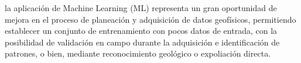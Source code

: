 la aplicación de Machine Learning (ML) representa un gran oportunidad de mejora en el proceso de planeación y adquisición de datos geofísicos, permitiendo establecer un conjunto de entrenamiento con pocos datos de entrada, con la posibilidad de validación en campo durante la adquisición e identificación de patrones, o bien, mediante reconocimiento geológico o expoliación directa.











